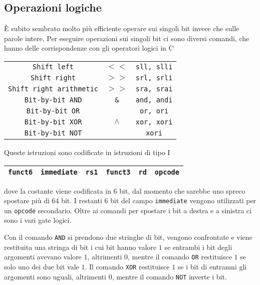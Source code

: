 \documentclass[a4paper,12pt]{article}
\theoremstyle{break}
\newcommand{\code}[1]{\texttt{#1}}
\numberwithin{equation}{section}
\begin{document}
\subsection{Operazioni logiche}
È subito sembrato molto più efficiente operare sui singoli bit invece che sulle parole intere. Per eseguire operazioni sui singoli bit ci sono diversi comandi, che hanno delle corrispondenze con gli operatori logici in C
\begin{center}
    \begin{tabular}{ccc}
        \code{Shift left} & \(<<\) & \code{sll, slli}\\
        \code{Shift right} & \(>>\) & \code{srl, srli} \\
        \code{Shift right arithmetic} & \(>>\) & \code{sra, srai} \\
        \code{Bit-by-bit AND} & \code{\&} & \code{and, andi} \\
        \code{Bit-by-bit OR} & \vline & \code{or, ori} \\
        \code{Bit-by-bit XOR} & \(\land\) & \code{xor, xori} \\
        \code{Bit-by-bit NOT} &\code{\texttildelow} & \code{xori} \\
    \end{tabular}
\end{center}
Queste istruzioni sono codificate in istruzioni di tipo I
\begin{center}
    \begin{tabular}{|c|c|c|c|c|c|}
        \hline
        \code{funct6} & \code{immediate} & \code{rs1} & \code{funct3} & \code{rd} & \code{opcode} \\
        \hline
    \end{tabular}
\end{center}
dove la costante viene codificata in \(6\) bit, dal momento che sarebbe uno spreco spostare più di \(64\) bit. I restanti \(6\) bit del campo \code{immediate} vengono utilizzati per un \code{opcode} secondario.
Oltre ai comandi per spostare i bit a destra e a sinistra ci sono i vari gate logici. 

Con il comando \code{AND} si prendono due stringhe di bit, vengono confrontate e viene restituita una stringa di bit i cui bit hanno valore \(1\) se entrambi i bit degli argomenti avevano valore \(1\), altrimenti \(0\), mentre il comando \code{OR} restituisce \(1\) se solo uno dei due bit vale \(1\).
Il comando \code{XOR} restituisce \(1\) se i bit di entramni gli argomenti sono uguali, altrimenti \(0\), mentre il comando \code{NOT} inverte i bit.
\end{document}
